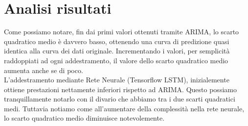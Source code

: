 \documentclass[a4paper,12pt]{article}
\begin{document}
    \section{Analisi risultati}Come possiamo notare, fin dai primi valori
    ottenuti tramite ARIMA, lo scarto quadratico medio è davvero basso, 
    ottenendo una curva di predizione quasi identica alla curva dei dati 
    originale. Incrementando i valori, per semplicità raddoppiati ad ogni
    addestramento, il valore dello scarto quadratico medio aumenta 
    anche se di poco.\\
    L'addestramento mediante Rete Neurale (Tensorflow LSTM), inizialemente
    ottiene prestazioni nettamente inferiori rispetto ad ARIMA. Questo possiamo
    tranquillamente notarlo con il divario che abbiamo tra i due scarti 
    quadratici medi. Tuttavia notiamo come all'aumentare della complessità 
    nella rete neurale, lo scarto quadratico medio diminuisce notevolemente.
\end{document}
